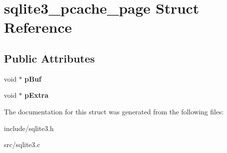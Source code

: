 \hypertarget{structsqlite3__pcache__page}{\section{sqlite3\-\_\-pcache\-\_\-page Struct Reference}
\label{structsqlite3__pcache__page}
}
\subsection*{Public Attributes}
\begin{DoxyCompactItemize}
\item 
\hypertarget{structsqlite3__pcache__page_aa5446325077c05e4b242c8e2d0faba3b}{void $\ast$ {\bfseries p\-Buf}}\label{structsqlite3__pcache__page_aa5446325077c05e4b242c8e2d0faba3b}

\item 
\hypertarget{structsqlite3__pcache__page_a96d7b0314d02837dd6a5e7057912f74f}{void $\ast$ {\bfseries p\-Extra}}\label{structsqlite3__pcache__page_a96d7b0314d02837dd6a5e7057912f74f}

\end{DoxyCompactItemize}


The documentation for this struct was generated from the following files\-:\begin{DoxyCompactItemize}
\item 
include/sqlite3.\-h\item 
src/sqlite3.\-c\end{DoxyCompactItemize}
